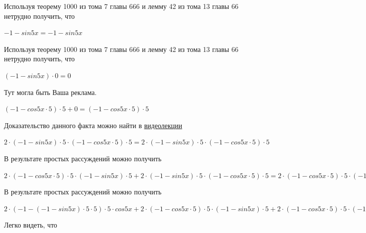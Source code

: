 \documentclass[12pt,a4paper,fleqn]{article}
\theoremstyle{definition}
\begin{document}
Используя теорему 1000 из тома 7 главы 666 и лемму 42 из тома 13 главы 66 нетрудно получить, что 

$ -1  - sin 5  x  =  -1  - sin 5  x $

Используя теорему 1000 из тома 7 главы 666 и лемму 42 из тома 13 главы 66 нетрудно получить, что 

$( -1  - sin 5  x ) \cdot  0  =  0 $

Тут могла быть Ваша реклама. 

$( -1  - cos 5  x  \cdot  5 ) \cdot  5  +  0  = ( -1  - cos 5  x  \cdot  5 ) \cdot  5 $

Доказательство данного факта можно найти в \href{https://www.youtube.com/watch?v=dQw4w9WgXcQ}{видеолекции} 

$ 2  \cdot ( -1  - sin 5  x ) \cdot  5  \cdot ( -1  - cos 5  x  \cdot  5 ) \cdot  5  =  2  \cdot ( -1  - sin 5  x ) \cdot  5  \cdot ( -1  - cos 5  x  \cdot  5 ) \cdot  5 $

В результате простых рассуждений можно получить 

$ 2  \cdot ( -1  - cos 5  x  \cdot  5 ) \cdot  5  \cdot ( -1  - sin 5  x ) \cdot  5  +  2  \cdot ( -1  - sin 5  x ) \cdot  5  \cdot ( -1  - cos 5  x  \cdot  5 ) \cdot  5  =  2  \cdot ( -1  - cos 5  x  \cdot  5 ) \cdot  5  \cdot ( -1  - sin 5  x ) \cdot  5  +  2  \cdot ( -1  - sin 5  x ) \cdot  5  \cdot ( -1  - cos 5  x  \cdot  5 ) \cdot  5 $

В результате простых рассуждений можно получить 

$ 2  \cdot ( -1  - ( -1  - sin 5  x ) \cdot  5  \cdot  5 ) \cdot  5  \cdot cos 5  x  +  2  \cdot ( -1  - cos 5  x  \cdot  5 ) \cdot  5  \cdot ( -1  - sin 5  x ) \cdot  5  +  2  \cdot ( -1  - cos 5  x  \cdot  5 ) \cdot  5  \cdot ( -1  - sin 5  x ) \cdot  5  +  2  \cdot ( -1  - sin 5  x ) \cdot  5  \cdot ( -1  - cos 5  x  \cdot  5 ) \cdot  5  =  2  \cdot ( -1  - ( -1  - sin 5  x ) \cdot  5  \cdot  5 ) \cdot  5  \cdot cos 5  x  +  2  \cdot ( -1  - cos 5  x  \cdot  5 ) \cdot  5  \cdot ( -1  - sin 5  x ) \cdot  5  +  2  \cdot ( -1  - cos 5  x  \cdot  5 ) \cdot  5  \cdot ( -1  - sin 5  x ) \cdot  5  +  2  \cdot ( -1  - sin 5  x ) \cdot  5  \cdot ( -1  - cos 5  x  \cdot  5 ) \cdot  5 $

Легко видеть, что 
\end{document}
